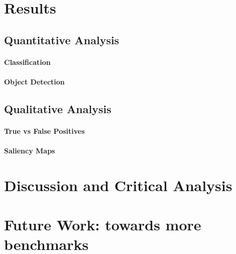 \section{Results}
\label{sec:results}

\subsection{Quantitative Analysis}
\paragraph{Classification}
\paragraph{Object Detection}

\subsection{Qualitative Analysis}
\paragraph{True vs False Positives}
\paragraph{Saliency Maps}


\section{Discussion and Critical Analysis}
\label{sec:discussion}


\section{Future Work: towards more benchmarks}
\label{sec:future_work}

